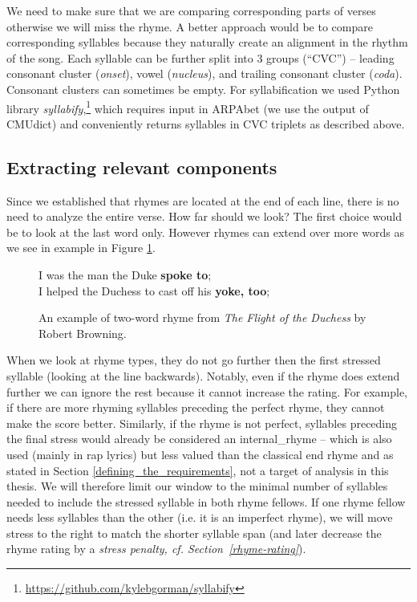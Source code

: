 We need to make sure that we are comparing corresponding parts of verses otherwise we will miss the rhyme. A better approach would be to compare corresponding syllables because they naturally create an alignment in the rhythm of the song. Each syllable can be further split into 3 groups (``CVC'') -- leading consonant cluster (\textit{onset}), vowel (\textit{nucleus}), and trailing consonant cluster (\textit{coda}). Consonant clusters can sometimes be empty. For syllabification we used Python library \textit{syllabify},\footnote{\url{https://github.com/kylebgorman/syllabify}} which requires input in ARPAbet (we use the output of CMUdict) and conveniently returns syllables in CVC triplets as described above.


\subsection{Extracting relevant components}\label{extracting_relevant_phonemes}
Since we established that rhymes are located at the end of each line, there is no need to analyze the entire verse. How far should we look? The first choice would be to look at the last word only. However rhymes can extend over more words as we see in example in Figure \ref{two-word_rhyme}.
\begin{figure}[htb]\centering
	I was the man the Duke \textbf{spoke to};\\
	I helped the Duchess to cast off his \textbf{yoke, too};\\
	\caption{An example of two-word rhyme from \textit{The Flight of the Duchess} by Robert Browning.} 
	\label{two-word_rhyme}
\end{figure} 

When we look at rhyme types, they do not go further then the first stressed syllable (looking at the line backwards). Notably, even if the rhyme does extend further we can ignore the rest because it cannot increase the rating. For example, if there are more rhyming syllables preceding the perfect rhyme, they cannot make the score better. Similarly, if the rhyme is not perfect, syllables preceding the final stress would already be considered an \gls{internal_rhyme} -- which is also used (mainly in rap lyrics) but less valued than the classical end rhyme and as stated in Section \ref{defining_the_requirements}, not a target of analysis in this thesis. We will therefore limit our window to the minimal number of syllables needed to include the stressed syllable in both rhyme fellows. If one rhyme fellow needs less syllables than the other (i.e. it is an imperfect rhyme), we will move stress to the right to match the shorter syllable span (and later decrease the rhyme rating by a \textit{stress penalty, cf. Section~\ref{rhyme-rating}}).



